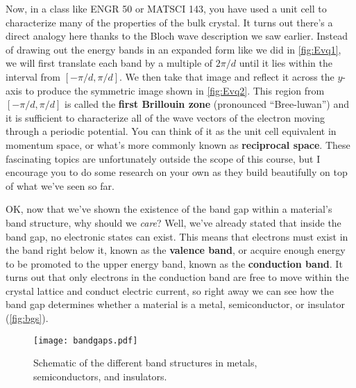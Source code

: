 Now, in a class like ENGR 50 or MATSCI 143, you have used a unit cell to characterize many of the properties of the bulk crystal. 
It turns out there's a direct analogy here thanks to the Bloch wave description we saw earlier. 
Instead of drawing out the energy bands in an expanded form like we did in \autoref{fig:Evq1}, we will first translate each band by a multiple of $2\pi/d$ until it lies within the interval from $[-\pi/d, \pi/d]$. 
We then take that image and reflect it across the $y$-axis to produce the symmetric image shown in \autoref{fig:Evq2}. 
This region from $[-\pi/d, \pi/d]$ is called the \textbf{first Brillouin zone} (pronounced ``Bree-luwan'') and it is sufficient to characterize all of the wave vectors of the electron moving through a periodic potential. 
You can think of it as the unit cell equivalent in momentum space, or what's more commonly known as \textbf{reciprocal space}. 
These fascinating topics are unfortunately outside the scope of this course, but I encourage you to do some research on your own as they build beautifully on top of what we've seen so far.

OK, now that we've shown the existence of the band gap within a material's band structure, why should we \emph{care}? 
Well, we've already stated that inside the band gap, no electronic states can exist. 
This means that electrons must exist in the band right below it, known as the \textbf{valence band}, or acquire enough energy to be promoted to the upper energy band, known as the \textbf{conduction band}. 
It turns out that only electrons in the conduction band are free to move within the crystal lattice and conduct electric current, so right away we can see how the band gap determines whether a material is a metal, semiconductor, or insulator (\autoref{fig:bgs}).

\begin{figure}[!h]
	\centering
	\texttt{[image: bandgaps.pdf]}
	\caption{Schematic of the different band structures in metals, semiconductors, and insulators.}
	\label{fig:bgs}
\end{figure}

